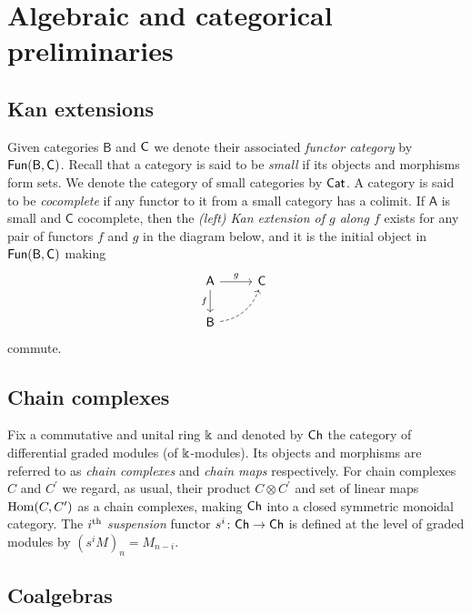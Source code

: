 
\section{Algebraic and categorical preliminaries}

\subsection{Kan extensions}

Given categories $\mathsf{B}$ and $\mathsf{C}$ we denote their associated \textit{functor category} by $\mathsf{Fun}(\mathsf{B}, \mathsf{C})$.
Recall that a category is said to be \textit{small} if its objects and morphisms form sets.
We denote the category of small categories by $\mathsf{Cat}$.
A category is said to be \textit{cocomplete} if any functor to it from a small category has a colimit.
If $\mathsf{A}$ is small and $\mathsf{C}$ cocomplete, then the \textit{(left) Kan extension of $g$ along $f$} exists for any pair of functors $f$ and $g$ in the diagram below, and it is the initial object in $\mathsf{Fun}(\mathsf{B}, \mathsf{C})$ making
\begin{equation*}
\begin{tikzcd}[column sep=normal, row sep=normal]
\mathsf{A} \arrow[d, "f"'] \arrow[r, "g"] & \mathsf{C} \\ 
\mathsf{B} \arrow[dashed, ur, bend right] & \quad 
\end{tikzcd}
\end{equation*}
commute.

\subsection{Chain complexes}

Fix a commutative and unital ring $\Bbbk$ and denoted by $\mathsf{Ch}$ the category of differential graded modules (of $\Bbbk$-modules).
Its objects and morphisms are referred to as \textit{chain complexes} and \textit{chain maps} respectively.
For chain complexes $C$ and $C^\prime$ we regard, as usual, their product $C \otimes C^\prime$ and set of linear maps $\mathrm{Hom}(C, C^\prime)$ as a chain complexes, making $\mathsf{Ch}$ into a closed symmetric monoidal category.
The $i^\mathrm{th}$ \textit{suspension} functor $s^i \colon \mathsf{Ch} \to \mathsf{Ch}$ is defined at the level of graded modules by $(s^{i}M)_n = M_{n-i}$.

\subsection{Coalgebras} \label{ss:coalgebras}

